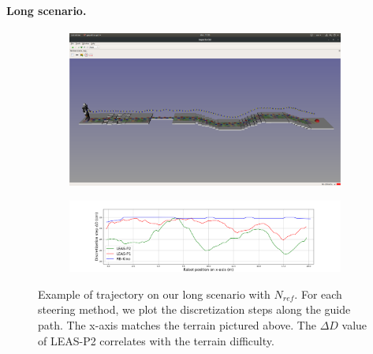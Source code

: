 \paragraph{Long scenario.}
\begin{figure}[ht]
    \centering
    \captionsetup[subfigure]{justification=centering}
    \begin{subfigure}[t]{0.9\linewidth}
        \includegraphics[trim={1cm 12cm 1cm 15cm}, clip,width=\textwidth]{Figures/Chapter_MIP_SL1M/1x11_guide_all_surf_steps.png}
    \end{subfigure}
    \begin{subfigure}[t]{0.9\linewidth}
        \includegraphics[trim={4cm 0cm 3.5cm 1.65cm}, clip,width=\textwidth]{Figures/Chapter_MIP_SL1M/res_mip/Long_discr_x_axis.png}
    \end{subfigure}
    \caption{Example of trajectory on our long scenario with $N_{ref}$. For each steering method, we plot the discretization steps along the guide path. The x-axis matches the terrain pictured above. The $\Delta D$ value of LEAS-P2 correlates with the terrain difficulty.}
    \label{fig:mip:long_range}
\end{figure}

